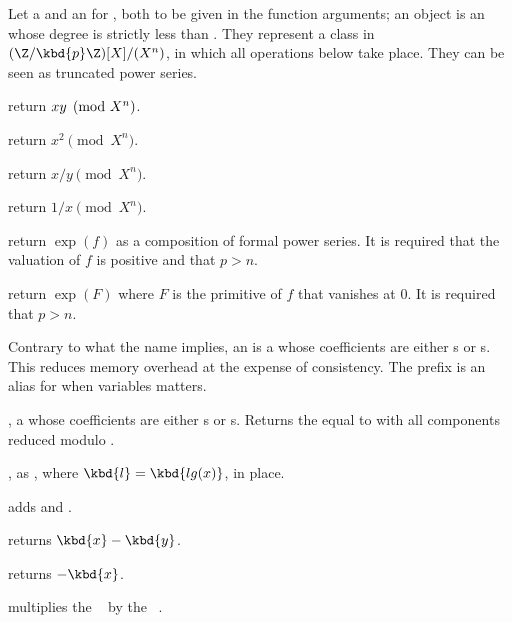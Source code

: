  Let  a  and  an
 for , both to be given in the function arguments; an 
object is an  whose degree is strictly less than .
They represent a class in $(\Z/\kbd{p}\Z)[X] / (X^n)$, in which all operations
below take place. They can be seen as truncated power series.

 return $x\*y\pmod{X^n}$.

 return $x^2\pmod{X^n}$.

 return $x/y\pmod{X^n}$.

 return $1/x\pmod{X^n}$.

 return $\exp(f)$
as a composition of formal power series.
It is required that the valuation of $f$ is positive and that $p>n$.

 return $\exp(F)$
where $F$ is the primitive of $f$ that vanishes at $0$.
It is required that $p>n$.




Contrary to what the name implies, an  is a  whose
coefficients are either s or s. This reduces memory
overhead at the expense of consistency. The prefix  is an
alias for  when variables matters.

,  a  whose coefficients are
either s or s. Returns the  equal to  with
all components reduced modulo .

, as , where
$\kbd{l} = \kbd{lg(x)}$, in place.

 adds  and .

 returns $\kbd{x}-\kbd{y}$.

 returns $-\kbd{x}$.

 multiplies the ~
by the ~.

